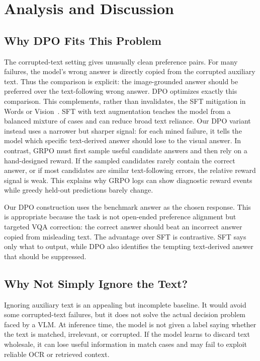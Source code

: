 \section{Analysis and Discussion}

\subsection{Why DPO Fits This Problem}

The corrupted-text setting gives unusually clean preference pairs.
For many failures, the model's wrong answer is directly copied from the corrupted auxiliary text.
Thus the comparison is explicit: the image-grounded answer should be preferred over the text-following wrong answer.
DPO optimizes exactly this comparison.
This complements, rather than invalidates, the SFT mitigation in Words or Vision~\cite{deng2025words}.
SFT with text augmentation teaches the model from a balanced mixture of cases and can reduce broad text reliance.
Our DPO variant instead uses a narrower but sharper signal: for each mined failure, it tells the model which specific text-derived answer should lose to the visual answer.
In contrast, GRPO must first sample useful candidate answers and then rely on a hand-designed reward.
If the sampled candidates rarely contain the correct answer, or if most candidates are similar text-following errors, the relative reward signal is weak.
This explains why GRPO logs can show diagnostic reward events while greedy held-out predictions barely change.

Our DPO construction uses the benchmark answer as the chosen response.
This is appropriate because the task is not open-ended preference alignment but targeted VQA correction: the correct answer should beat an incorrect answer copied from misleading text.
The advantage over SFT is contrastive.
SFT says only what to output, while DPO also identifies the tempting text-derived answer that should be suppressed.

\subsection{Why Not Simply Ignore the Text?}

Ignoring auxiliary text is an appealing but incomplete baseline.
It would avoid some corrupted-text failures, but it does not solve the actual decision problem faced by a VLM.
At inference time, the model is not given a label saying whether the text is matched, irrelevant, or corrupted.
If the model learns to discard text wholesale, it can lose useful information in match cases and may fail to exploit reliable OCR or retrieved context.

